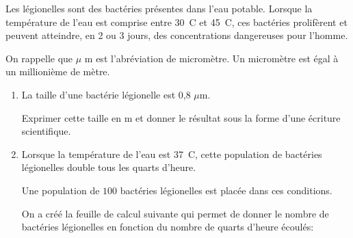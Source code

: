 
\medskip

Les légionelles sont des bactéries présentes dans l'eau potable. Lorsque la température de l'eau est comprise
entre 30~\degres C et 45~\degres C, ces bactéries prolifèrent et peuvent atteindre, en 2 ou 3 jours, des concentrations dangereuses pour l'homme.

On rappelle que \og $\mu$ m \fg{} est l'abréviation de micromètre. Un micromètre est égal à un millionième de mètre.

\medskip

\begin{enumerate}
\item La taille d'une bactérie légionelle est 0,8 $\mu$m.

Exprimer cette taille en m et donner le résultat sous la forme d'une écriture scientifique.
\item  Lorsque la température de l'eau est 37~\degres C, cette population de bactéries légionelles double tous les quarts d'heure.

Une population de $100$ bactéries légionelles est placée dans ces conditions.

On a créé la feuille de calcul suivante qui permet de donner le nombre de bactéries légionelles en fonction du nombre de quarts d'heure écoulés:


\end{enumerate}

